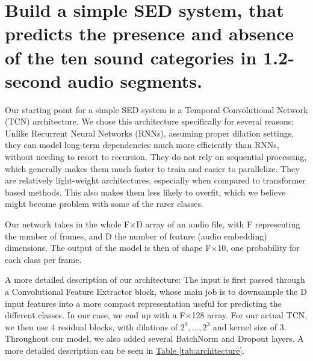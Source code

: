 
\section{Build a simple SED system, that predicts the presence and absence of the ten sound categories in 1.2-second audio segments.} 
\label{sec:Build a simple SED system}

Our starting point for a simple SED system is a Temporal Convolutional Network (TCN) architecture. We chose this architecture specifically for several reasons:
\newline
Unlike Recurrent Neural Networks (RNNs), assuming proper dilation settings, they can model long-term dependencies much more efficiently than RNNs, without needing to resort to recursion. They do not rely on sequential processing, which generally makes them much faster to train and easier to parallelize. They are relatively light-weight architectures, especially when compared to transformer based methods. This also makes them less likely to overfit, which we believe might become problem with some of the rarer classes.

Our network takes in the whole F$\times$D array of an audio file, with F representing the number of frames, and D the number of feature (audio embedding) dimensions. The output of the model is then of shape F$\times$10, one probability for each class per frame.

A more detailed description of our architecture: The input is first passed through a Convolutional Feature Extractor block, whose main job is to downsample the D input features into a more compact representation useful for predicting the different classes. In our case, we end up with a F$\times$128 array. For our actual TCN, we then use 4 residual blocks, with dilations of $2^0, \dots, 2^3$ and kernel size of 3. Throughout our model, we also added several BatchNorm and Dropout layers. A more detailed description can be seen in \hyperref[tab:architecture]{Table \ref{tab:architecture}}.


